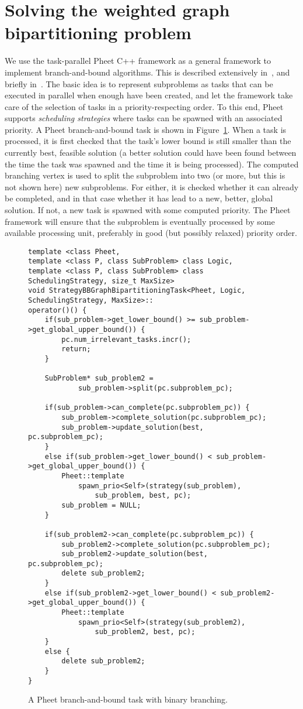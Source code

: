 \documentclass[a4paper,11pt]{article}
\begin{document}
\section{Solving the weighted graph bipartitioning problem}

We use the task-parallel Pheet C++ framework as a general framework to
implement branch-and-bound algorithms. This is described extensively
in~\cite{Wimmer14:diss}, and briefly
in~\cite{Traff13:strategies,Traff14:priosched}. The basic idea is to
represent subproblems as tasks that can be executed in parallel when
enough have been created, and let the framework take care of the
selection of tasks in a priority-respecting order. To this end, Pheet
supports \emph{scheduling strategies} where tasks can be spawned with
an associated priority. A Pheet branch-and-bound task is shown in
Figure~\ref{fig:bbtask}. When a task is processed, it is first checked
that the task's lower bound is still smaller than the currently best,
feasible solution (a better solution could have been found between
the time the task was spawned and the time it is being processed).
The computed branching vertex is used to split the subproblem into two
(or more, but this is not shown here) new subproblems. For either, it
is checked whether it can already be completed, and in that case
whether it has lead to a new, better, global solution. If not, a new
task is spawned with some computed priority. The Pheet framework
will ensure that the subproblem is eventually processed by some
available processing unit, preferably in good (but possibly relaxed)
priority order.

\begin{figure}
\begin{lstlisting}[mathescape=true,columns=flexible]
template <class Pheet, 
template <class P, class SubProblem> class Logic, 
template <class P, class SubProblem> class SchedulingStrategy, size_t MaxSize>
void StrategyBBGraphBipartitioningTask<Pheet, Logic, SchedulingStrategy, MaxSize>::
operator()() {
	if(sub_problem->get_lower_bound() >= sub_problem->get_global_upper_bound()) {
		pc.num_irrelevant_tasks.incr();
		return;
	}

	SubProblem* sub_problem2 =
			sub_problem->split(pc.subproblem_pc);

	if(sub_problem->can_complete(pc.subproblem_pc)) {
		sub_problem->complete_solution(pc.subproblem_pc);
		sub_problem->update_solution(best, pc.subproblem_pc);
	}
	else if(sub_problem->get_lower_bound() < sub_problem->get_global_upper_bound()) {
		Pheet::template
			spawn_prio<Self>(strategy(sub_problem),
				sub_problem, best, pc);
		sub_problem = NULL;
	}

	if(sub_problem2->can_complete(pc.subproblem_pc)) {
		sub_problem2->complete_solution(pc.subproblem_pc);
		sub_problem2->update_solution(best, pc.subproblem_pc);
		delete sub_problem2;
	}
	else if(sub_problem2->get_lower_bound() < sub_problem2->get_global_upper_bound()) {
		Pheet::template
			spawn_prio<Self>(strategy(sub_problem2),
				sub_problem2, best, pc);
	}
	else {
		delete sub_problem2;
	}
}
\end{lstlisting}
\caption{A Pheet branch-and-bound task with binary branching.}
\label{fig:bbtask}
\end{figure}
\end{document}
